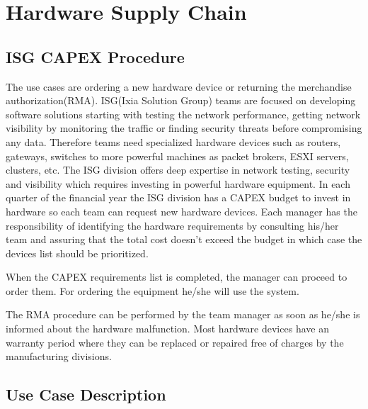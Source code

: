 \chapter{Hardware Supply Chain}
\label{chapter:chapter4}

\section{ISG CAPEX Procedure}
\label{sub-sec:chapter4-section1}
The \emph{\project} use cases are ordering a new hardware device or returning the merchandise authorization(RMA).
ISG(Ixia Solution Group) teams are focused on developing software solutions starting with testing the network performance, getting network visibility by monitoring the traffic or finding security threats before compromising any data.
Therefore teams need specialized hardware devices such as routers, gateways, switches to more powerful machines as packet brokers, ESXI servers, clusters, etc.
The ISG division offers deep expertise in network testing, security and visibility which requires investing in powerful hardware equipment.
In each quarter of the financial year the ISG division has a CAPEX budget to invest in hardware so each team can request new hardware devices.
Each manager has the responsibility of identifying the hardware requirements by consulting his/her team and assuring that the total cost doesn't exceed the budget in which case the devices list should be prioritized.

When the CAPEX requirements list is completed, the manager can proceed to order them.
For ordering the equipment he/she will use the \emph{\project} system.

The RMA procedure can be performed by the team manager as soon as he/she is informed about the hardware malfunction. Most hardware devices have an warranty period where they can be replaced or repaired free of charges by the manufacturing divisions. 

\section{Use Case Description}
\label{sub-sec:chapter4-section1}




